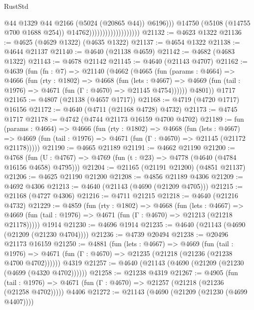 \begin{lexlean}{RustStd}
\begin{coremodule}
                                                @44
                                                @1329
                                                @44
                                                @2166
                                                (@5024 (@20865 @44))
                                                @6196)))
                                          @14750
                                          (@5108 (@14755 @700 @1688 @254))
                                          @14762)))))))))))))))))))
@21132 := @4623 @1322
@21136 := @4625 (@4629 @1322) (@4635 @1322)
@21137 := @4654 @1322
@21138 := @4644 @21137
@21140 := @4640 (@21138 @4659)
@21142 := @4682 (@4683 @1322)
@21143 := @4678 @21142
@21145 := @4640 (@21143 @4707)
@21162 := @4639
    (fun (fn : @7) =>
    @21140
      (@4662
        (@4665
          (fun (params : @4664) =>
          @4666
            (fun (rty : @1802) =>
            @4668
              (fun (lets : @4667) =>
              @4669 (fun (tail : @1976) => @4671 (fun (Γ : @4670) => @21145 @4754))))))
        @4801))
    @1717
@21165 := @4807 (@21138 (@4657 @1717))
@21168 := @4719 (@4720 @1717) @16156
@21172 := @4640 (@4711 (@21168 @4728) @4732)
@21173 := @4745 @1717
@21178 := @4742 (@4744 @21173 @16159 @4700 @4702)
@21189 := fun (params : @4664) =>
  @4666
    (fun (rty : @1802) =>
    @4668
      (fun (lets : @4667) =>
      @4669 (fun (tail : @1976) => @4671 (fun (Γ : @4670) => @21145 (@21172 @21178)))))
@21190 := @4665 @21189
@21191 := @4662 @21190
@21200 := @4768
    (fun (U : @4767) => @4769 (fun (t : @23) => @4778 (@4640 (@4784 @16156 @4658) @4795)))
@21204 := @21165 (@21191 @21200) (@4851 @21137)
@21206 := @4625 @21190 @21200
@21208 := @4856 @21189 @4306
@21209 := @4692 @4306
@21213 := @4640 (@21143 (@4690 (@21209 @4705)))
@21215 := @21168 (@4727 @4306)
@21216 := @4711 @21215
@21218 := @4640 (@21216 @4732)
@21229 := @4859
    (fun (rty : @1802) =>
    @4668
      (fun (lets : @4667) =>
      @4669 (fun (tail : @1976) => @4671 (fun (Γ : @4670) => @21213 (@21218 @21178)))))
    @1914
@21230 := @4696 @1914
@21235 := @4640 (@21143 (@4690 (@21209 (@21230 @4704))))
@21236 := @4739 @20494
@21238 := @20496 @21173 @16159
@21250 := @4881
    (fun (lets : @4667) =>
    @4669
      (fun (tail : @1976) =>
      @4671 (fun (Γ : @4670) => @21235 (@21218 (@21236 (@21238 @4700 @4702))))))
    @4319
@21257 := @4640 (@21143 (@4690 (@21209 (@21230 (@4699 (@4320 @4702))))))
@21258 := @21238 @4319
@21267 := @4905
    (fun (tail : @1976) => @4671 (fun (Γ : @4670) => @21257 (@21218 (@21236 (@21258 @4702)))))
    @4406
@21272 := @21143 (@4690 (@21209 (@21230 (@4699 @4407))))

\end{coremodule}
\end{lexlean}
